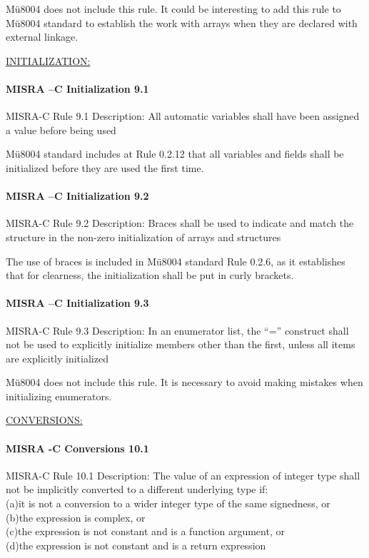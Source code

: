 Mü8004 does not include this rule. It could be interesting to add this rule to Mü8004 standard to establish the work with arrays when they are declared with external linkage.


\begin{center}
\textsc{\underline{INITIALIZATION:}}
\end{center}

\paragraph{MISRA –C Initialization 9.1}
MISRA-C Rule 9.1 Description: All automatic variables shall have been assigned a value before being used 

Mü8004 standard includes at Rule 0.2.12 that all variables and fields shall be initialized before they are used the first time.

\paragraph{MISRA –C Initialization 9.2}
MISRA-C Rule 9.2 Description: Braces shall be used to indicate and match the structure in the non-zero initialization of arrays and structures

The use of braces is included in Mü8004 standard Rule 0.2.6, as it establishes that for clearness, the initialization shall be put in curly brackets.

\paragraph{MISRA –C Initialization 9.3}
MISRA-C Rule 9.3 Description: In an enumerator list, the “=” construct shall not be used to explicitly initialize members other than the first, unless all items are explicitly initialized

Mü8004 does not include this rule. It is necessary to avoid making mistakes when initializing enumerators.

\begin{center}
\textsc{\underline{CONVERSIONS:}}
\end{center}

\paragraph{MISRA -C Conversions 10.1}
MISRA-C Rule 10.1 Description: The value of an expression of integer type shall not be implicitly
converted to a different underlying type if:\\
(a)it is not a conversion to a wider integer type of the same
signedness, or \\
(b)the expression is complex, or \\
(c)the expression is not constant and is a function argument, or \\
(d)the expression is not constant and is a return expression

